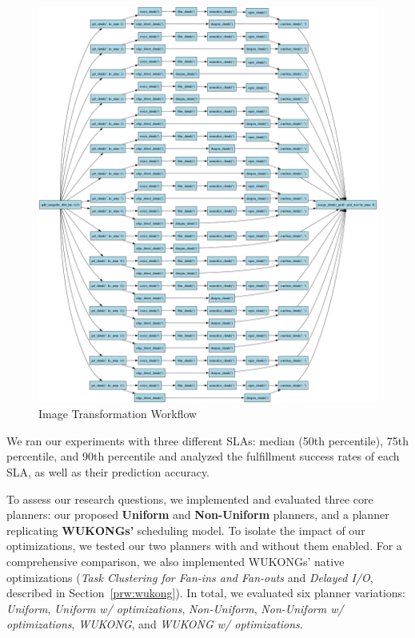 \documentclass[conference]{IEEEtran}
\begin{document}
\begin{figure}[H]
    \centering
    \includegraphics[width=\columnwidth]{figures/dag_image_image_transformer.png}
    \caption{Image Transformation Workflow}
    \label{fig:image_transformer}
\end{figure}

We ran our experiments with three different SLAs: median (50th percentile), 75th percentile, and 90th percentile and analyzed the fulfillment success rates of each SLA, as well as their prediction accuracy.

To assess our research questions, we implemented and evaluated three core planners: our proposed \textbf{Uniform} and \textbf{Non-Uniform} planners, and a planner replicating \textbf{WUKONGs'} scheduling model. To isolate the impact of our optimizations, we tested our two planners with and without them enabled. For a comprehensive comparison, we also implemented WUKONGs' native optimizations (\textit{Task Clustering for Fan-ins and Fan-outs} and \textit{Delayed I/O}, described in Section~\ref{prw:wukong}). In total, we evaluated six planner variations: \textit{Uniform}, \textit{Uniform w/ optimizations}, \textit{Non-Uniform}, \textit{Non-Uniform w/ optimizations}, \textit{WUKONG}, and \textit{WUKONG w/ optimizations}.
\end{document}
